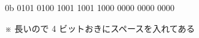 \begin{center}
0b 0101	0100 1001 1001 1000 0000 0000 0000

\noindent ※ 長いので 4 ビットおきにスペースを入れてある
\end{center}
